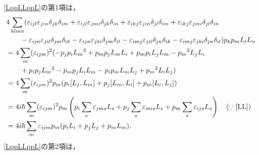 \eqref{LppLLppL}の第1項は，
\begin{align}
  & 4\sum_{klmn}(\varepsilon_{ijl}\varepsilon_{jin}\delta_{jk}\delta_{im} + \varepsilon_{ijl}\varepsilon_{jmi}\delta_{jk}\delta_{in} + \varepsilon_{ikj}\varepsilon_{jin}\delta_{jl}\delta_{im} + \varepsilon_{ikj}\varepsilon_{jmi}\delta_{jl}\delta_{in}\notag\\
  & \qquad - \varepsilon_{ijn}\varepsilon_{jil}\delta_{jm}\delta_{ik} - \varepsilon_{ijn}\varepsilon_{jki}\delta_{jm}\delta_{il} - \varepsilon_{imj}\varepsilon_{jil}\delta_{jn}\delta_{ik} - \varepsilon_{imj}\varepsilon_{jki}\delta_{jn}\delta_{il})p_kp_mL_lL_n\notag\\
  & = 4\sum_{m}(\varepsilon_{ijm})^2( - p_jp_iL_m{}^2 + p_mp_jL_mL_i + p_mp_iL_jL_m - p_m{}^2L_jL_i\notag\\
  & \qquad  + p_ip_jL_m{}^2 - p_mp_jL_iL_m - p_ip_mL_mL_j + p_m{}^2L_iL_j)\notag\\
  & = 4\sum_m(\varepsilon_{ijm})^2p_m(p_i[L_j,L_m] + p_j[L_m,L_i] + p_m[L_i,L_j])\notag\\
  & = 4i\hbar\sum_m(\varepsilon_{ijm})^2p_m\left(p_i\sum_s\varepsilon_{jms}L_s + p_j\sum_s\varepsilon_{mis}L_s + p_m\sum_s\varepsilon_{ijs}L_s\right)\quad(\because\eqref{LL})\notag\\
  & = 4i\hbar\sum_m\varepsilon_{ijm}p_m(p_iL_i + p_jL_j + p_mL_m)\label{LppLLppL_1}.
\end{align}
\eqref{LppLLppL}の第2項は，
